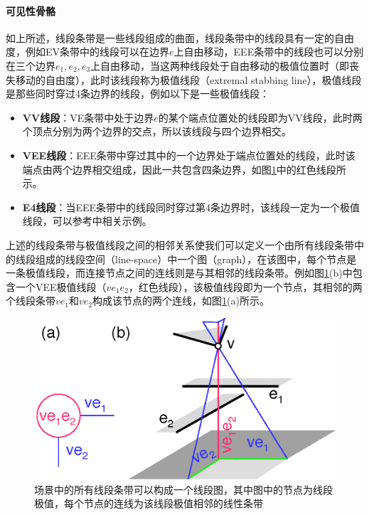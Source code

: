 \paragraph{可见性骨骼}
如上所述，线段条带是一些线段组成的曲面，线段条带中的线段具有一定的自由度，例如EV条带中的线段可以在边界$e$上自由移动，EEE条带中的线段也可以分别在三个边界$e_1,e_2,e_3$上自由移动，当这两种线段处于自由移动的极值位置时（即丧失移动的自由度），此时该线段称为极值线段（extremal stabbing line），极值线段是那些同时穿过4条边界的线段，例如以下是一些极值线段：

\begin{itemize}
	\item \textbf{VV线段}：VE条带中处于边界$e$的某个端点位置处的线段即为VV线段，此时两个顶点分别为两个边界的交点，所以该线段与四个边界相交。
	\item \textbf{VEE线段}：EEE条带中穿过其中的一个边界处于端点位置处的线段，此时该端点由两个边界相交组成，因此一共包含四条边界，如图\ref{f:r-visibility-skeleton}中的红色线段所示。
	\item \textbf{E4线段}：当EEE条带中的线段同时穿过第4条边界时，该线段一定为一个极值线段，可以参考\cite{a:TheVisibilitySkeleton:APowerfulAndEfficientMulti-PurposeGlobalVisibilityTool}中相关示例。
\end{itemize}

上述的线段条带与极值线段之间的相邻关系使我们可以定义一个由所有线段条带中的线段组成的线段空间（line-space）中一个图（graph），在该图中，每个节点是一条极值线段，而连接节点之间的连线则是与其相邻的线段条带。例如图\ref{f:r-visibility-skeleton}(b)中包含一个VEE极值线段（$ve_1e_2$，红色线段），该极值线段即为一个节点，其相邻的两个线段条带$ve_1$和$ve_2$构成该节点的两个连线，如图\ref{f:r-visibility-skeleton}(a)所示。

\begin{figure}
\sidecaption
	\includegraphics[width=.65\textwidth]{figures/r/visibility-skeleton}
	\caption{场景中的所有线段条带可以构成一个线段图，其中图中的节点为线段极值，每个节点的连线为该线段极值相邻的线性条带}
	\label{f:r-visibility-skeleton}
\end{figure}

